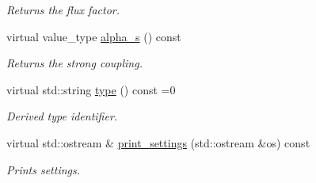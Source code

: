 \begin{DoxyCompactItemize}
\begin{DoxyCompactList}\small\item\em Returns the flux factor. \end{DoxyCompactList}\item 
\hypertarget{a00308_a235e07225bd71429967293fd8ffa59e3}{}virtual value\+\_\+type \hyperlink{a00308_a235e07225bd71429967293fd8ffa59e3}{alpha\+\_\+s} () const \label{a00308_a235e07225bd71429967293fd8ffa59e3}

\begin{DoxyCompactList}\small\item\em Returns the strong coupling. \end{DoxyCompactList}\item 
\hypertarget{a00308_abb55d9db34760632146d32786064d4de}{}virtual std\+::string \hyperlink{a00308_abb55d9db34760632146d32786064d4de}{type} () const =0\label{a00308_abb55d9db34760632146d32786064d4de}

\begin{DoxyCompactList}\small\item\em Derived type identifier. \end{DoxyCompactList}\item 
\hypertarget{a00308_aedbcaa7f7e09d1653fad1441e692be98}{}virtual std\+::ostream \& \hyperlink{a00308_aedbcaa7f7e09d1653fad1441e692be98}{print\+\_\+settings} (std\+::ostream \&os) const \label{a00308_aedbcaa7f7e09d1653fad1441e692be98}

\begin{DoxyCompactList}\small\item\em Prints settings. \end{DoxyCompactList}\end{DoxyCompactItemize}
